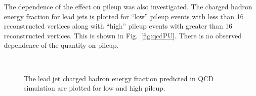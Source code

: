 The dependence of the effect on pileup was also investigated. The
charged hadron energy fraction for lead jets is plotted for ``low''
pileup events with less than 16 reconstructed vertices along with
``high'' pileup events with greater than 16 reconstructed vertices.
This is shown in Fig.~\ref{fig:qcdPU}. There is no observed dependence
of the quantity on pileup.

\begin{figure}[h!]
  \begin{center}
     ~~
    \caption{ The lead jet charged hadron energy fraction predicted in QCD
    simulation are plotted for low and high pileup.    }
    \label{fig:qcdCHF}
  \end{center} 
\end{figure}
